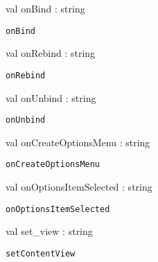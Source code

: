\documentclass[11pt]{article}
\begin{document}
\begin{ocamldocsigend}
\begin{ocamldocdescription}
\end{ocamldocdescription}


\label{val:Android.App.onBind}\begin{ocamldoccode}
val onBind : string
\end{ocamldoccode}
\begin{ocamldocdescription}
{\tt{onBind}}


\end{ocamldocdescription}


\label{val:Android.App.onRebind}\begin{ocamldoccode}
val onRebind : string
\end{ocamldoccode}
\begin{ocamldocdescription}
{\tt{onRebind}}


\end{ocamldocdescription}


\label{val:Android.App.onUnbind}\begin{ocamldoccode}
val onUnbind : string
\end{ocamldoccode}
\begin{ocamldocdescription}
{\tt{onUnbind}}


\end{ocamldocdescription}


\label{val:Android.App.onCreateOptionsMenu}\begin{ocamldoccode}
val onCreateOptionsMenu : string
\end{ocamldoccode}
\begin{ocamldocdescription}
{\tt{onCreateOptionsMenu}}


\end{ocamldocdescription}


\label{val:Android.App.onOptionsItemSelected}\begin{ocamldoccode}
val onOptionsItemSelected : string
\end{ocamldoccode}
\begin{ocamldocdescription}
{\tt{onOptionsItemSelected}}


\end{ocamldocdescription}


\label{val:Android.App.set-underscoreview}\begin{ocamldoccode}
val set_view : string
\end{ocamldoccode}
\begin{ocamldocdescription}
{\tt{setContentView}}



\end{ocamldocdescription}
\end{ocamldocsigend}
\end{document}
